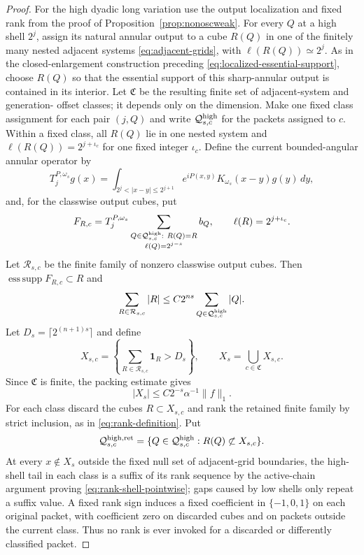 \documentclass[11pt]{article}
\numberwithin{equation}{section}
\theoremstyle{remark}
\theoremstyle{definition}
\newcommand{\norm}[1]{\lVert #1\rVert}
\begin{document}
\begin{proof}
For the high dyadic long variation use the output localization and fixed
rank from the proof of Proposition~\ref{prop:nonoscweak}.  For every $Q$
at a high shell $2^j$, assign its natural annular output to a cube $R(Q)$
in one of the finitely many nested adjacent systems
\eqref{eq:adjacent-grids}, with $\ell(R(Q))\simeq2^j$.  As in the
closed-enlargement construction preceding
\eqref{eq:localized-essential-support}, choose $R(Q)$ so that the
essential support of this sharp-annular output is contained in its
interior.  Let
$\mathfrak C$ be the resulting finite set of adjacent-system and generation-
offset classes; it depends only on the dimension.  Make one fixed class
assignment for each pair $(j,Q)$ and write $\mathcal Q_{s,c}^{\rm high}$
for the packets assigned to $c$.  Within a fixed class, all $R(Q)$ lie in
one nested system and $\ell(R(Q))=2^{j+\iota_c}$ for one fixed integer
$\iota_c$.  Define the current bounded-angular annular operator by
\[
 T_j^{P,\omega_s}g(x)=
 \int_{2^j<|x-y|\le2^{j+1}}e^{iP(x,y)}
 K_{\omega_s}(x-y)g(y)\,dy,
\]
and, for the classwise output cubes, put
\[
 F_{R,c}=T_j^{P,\omega_s}
 \sum_{\substack{Q\in\mathcal Q_{s,c}^{\rm high}:\ R(Q)=R\\
                  \ell(Q)=2^{j-s}}}b_Q,
 \qquad \ell(R)=2^{j+\iota_c}.
\]
Let $\mathcal R_{s,c}$ be the finite family of nonzero classwise output
cubes.  Then $\operatorname{ess\,supp}F_{R,c}\subset R$ and
\[
 \sum_{R\in\mathcal R_{s,c}}|R|
 \le C2^{ns}\sum_{Q\in\mathcal Q_{s,c}^{\rm high}}|Q|.
\]
Let $D_s=\lceil2^{(n+1)s}\rceil$ and define
\[
 X_{s,c}=\left\{\sum_{R\in\mathcal R_{s,c}}\mathbf1_R>D_s\right\},
 \qquad X_s=\bigcup_{c\in\mathfrak C}X_{s,c}.
\]
Since $\mathfrak C$ is finite, the packing estimate gives
\begin{equation}\label{eq:far-Xs}
 |X_s|\le C2^{-s}\alpha^{-1}\norm f_1.
\end{equation}
For each class discard the cubes $R\subset X_{s,c}$ and rank the retained
finite family by strict inclusion, as in \eqref{eq:rank-definition}.  Put
\[
 \mathcal Q_{s,c}^{\rm high,ret}
 =\{Q\in\mathcal Q_{s,c}^{\rm high}:R(Q)\not\subset X_{s,c}\}.
\]
At every $x\notin X_s$ outside the fixed null set of adjacent-grid
boundaries, the high-shell tail in each class is a suffix of its rank
sequence by the active-chain argument proving
\eqref{eq:rank-shell-pointwise}; gaps caused by low shells only repeat a
suffix value.
A fixed rank sign induces a fixed coefficient in $\{-1,0,1\}$ on each
original packet, with coefficient zero on discarded cubes and on packets
outside the current class.  Thus no rank is ever invoked for a discarded
or differently classified packet.


\end{proof}
\end{document}
